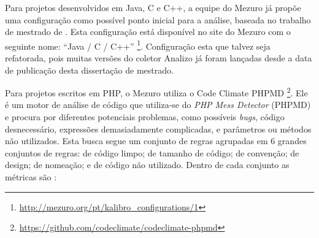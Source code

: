 Para projetos desenvolvidos em Java, C e C++, a equipe do Mezuro já propõe
uma configuração como possível ponto inicial para a análise, baseada no trabalho
de mestrado de . Esta configuração está disponível no site do
Mezuro com o seguinte nome: ``Java / C / C++''
\footnote{\url{http://mezuro.org/pt/kalibro_configurations/1}}. Configuração
esta que talvez seja refatorada, pois muitas versões do coletor Analizo já foram
lançadas desde a data de publicação desta dissertação de mestrado.

Para projetos escritos em PHP, o Mezuro utiliza o Code Climate PHPMD
\footnote{\url{https://github.com/codeclimate/codeclimate-phpmd}}.
Ele é um motor de análise de código que utiliza-se do \textit{PHP Mess Detector}
(PHPMD) e procura por diferentes potenciais problemas, como possíveis \textit{bugs},
código desnecessário, expressões demasiadamente complicadas, e parâmetros ou
métodos não utilizados. Esta busca segue um conjunto de regras agrupadas em 6
grandes conjuntos de regras: de código limpo; de tamanho de código; de
convenção; de design; de nomeação; e de código não utilizado. Dentro de cada
conjunto as métricas são \cite{PichlerPHPMD}:

